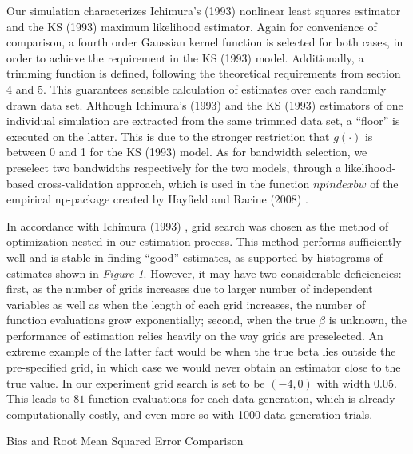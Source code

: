 Our simulation characterizes Ichimura's (1993) \cite{[6]} nonlinear least squares estimator and the KS (1993) \cite{[12]} maximum likelihood estimator. Again for convenience of comparison, a fourth order Gaussian kernel function is selected for both cases, in order to achieve the requirement in the KS (1993) \cite{[12]} model. Additionally, a trimming function is defined, following the theoretical requirements from section 4 and 5. This guarantees sensible calculation of estimates over each randomly drawn data set. Although Ichimura's (1993) \cite{[6]} and the KS (1993) \cite{[12]} estimators of one individual simulation are extracted from the same trimmed data set, a ``floor'' is executed on the latter. This is due to the stronger restriction that $g(\cdot)$ is between 0 and 1 for the KS (1993) \cite{[12]} model. As for bandwidth selection, we preselect two bandwidths respectively for the two models, through a likelihood-based cross-validation approach, which is used in the function $npindexbw$ of the empirical np-package created by Hayfield and Racine (2008) \cite{[28]}. 

In accordance with Ichimura (1993) \cite{[6]}, grid search was chosen as the method of optimization nested in our estimation process. This method performs sufficiently well and is stable in finding ``good'' estimates, as supported by histograms of estimates shown in \textit{Figure 1}. However, it may have two considerable deficiencies: first, as the number of grids increases due to larger number of independent variables as well as when the length of each grid increases, the number of function evaluations grow exponentially; second, when the true $\beta$ is unknown, the performance of estimation relies heavily on the way grids are preselected. An extreme example of the latter fact would be when the true beta lies outside the pre-specified grid, in which case we would never obtain an estimator close to the true value. In our experiment grid search is set to be $(-4,0)$ with width $0.05$. This leads to $81$ function evaluations for each data generation, which is already computationally costly, and even more so with 1000 data generation trials. 

\begin{table}[H]

\centering
{}
\caption {Bias and Root Mean Squared Error Comparison} \label{tab:bias and mean squared error}


\end{table}

